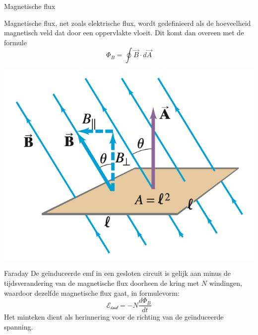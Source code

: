 \begin{theo}{Magnetische flux}
    \vspace{-0.65cm}
    \begin{minipage}{0.75\textwidth}
        Magnetische flux, net zoals elektrische flux, wordt gedefinieerd als de hoeveelheid magnetisch veld dat door een oppervlakte vloeit.
        Dit komt dan overeen met de formule 
        \begin{equation*}
            \Phi_{B} = \oint \Vec{B} \cdot d\Vec{A}
        \end{equation*}
    \end{minipage}
    \begin{minipage}{0.21\textwidth}
        \includegraphics[scale=0.3]{Images/Magnetisme/Faraday.png}
    \end{minipage}
    \vspace{-0.3cm}
\end{theo}
    
\newpage

\begin{lem}[Faraday]{Faraday}
    De geïnduceerde emf in een gesloten circuit is gelijk aan minus de tijdsverandering van de magnetische flux doorheen de kring met $N$ windingen,
    waardoor dezelfde magnetische flux gaat, in formulevorm:
    \begin{equation*}
        \mathcal{E_{\text{ind}}} = -N\dfrac{d\Phi_{B}}{dt}
    \end{equation*}
    Het minteken dient als herinnering voor de richting van de geïnduceerde spanning.
\end{lem}


